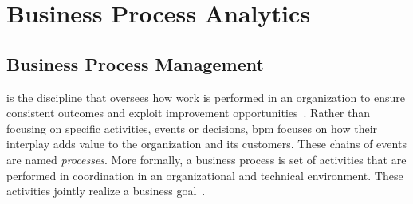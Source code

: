 





\section{Business Process Analytics}
\label{sec:bpa}

\subsection{Business Process Management}
\label{sec:business-process}

 is the discipline that oversees how work is performed in an organization to ensure consistent outcomes and exploit improvement opportunities~\citep{Dumas2018}. Rather than focusing on specific activities, events or decisions, \gls{bpm} focuses on how their interplay adds value to the organization and its customers. These chains of events are named \emph{processes}. More formally, a business process is set of activities that are performed in coordination in an organizational and technical
environment. These activities jointly realize a business goal~\citep{DBLP:books/sp/Weske19}.

